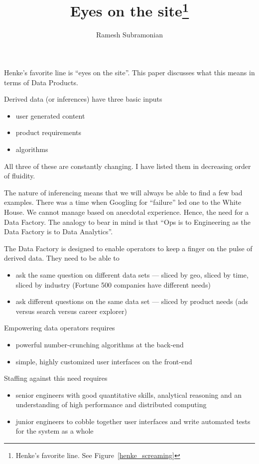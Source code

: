 \documentclass[letterpaper,12pt]{article}
\begin{document}
\title{Eyes on the site\footnote{Henke's favorite line. See
  Figure~\ref{henke_screaming}}}
\author{ Ramesh Subramonian }
\maketitle
\thispagestyle{fancy}
\cfoot{}
\rfoot{{\small \thepage}}

Henke's favorite line is ``eyes on the site''. This paper discusses what
this means in terms of Data Products.

Derived data (or inferences) have three basic inputs
\begin{itemize}
\item user generated content
\item product requirements
\item algorithms
\end{itemize}
All three of these are constantly changing. I have listed them in
decreasing order of fluidity.

The nature of inferencing means that we will always be able to find
a few bad examples. There was a time when Googling for ``failure'' led
one to the White House. We cannot manage based on anecdotal experience. Hence,
the need for a Data Factory. The analogy to bear in mind is that 
``Ops is to Engineering as the Data Factory is to Data Analytics''.

The Data Factory is designed to enable operators to keep a finger on the
pulse of derived data. They need to be able to 
\begin{itemize}
\item ask the same question on different data sets --- sliced by geo,
  sliced by time, sliced by industry (Fortune 500 companies have
      different needs)
\item ask different questions on the same data set --- sliced by product
needs (ads versus search versus career explorer)
\end{itemize}

Empowering data operators requires
\begin{itemize}
\item powerful number-crunching algorithms at the back-end
\item simple, highly customized user interfaces on the front-end
\end{itemize}

Staffing against this need requires
\begin{itemize}
\item senior engineers with good quantitative skills, analytical
reasoning and an understanding of high performance and distributed
computing
\item junior engineers to cobble together user interfaces and write
automated tests for the system as a whole
\end{itemize}
\end{document}
